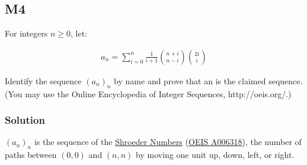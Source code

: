 \subsection*{M4}

For integers $n \geq 0$, let:

\begin{gather} \label{eq:m4}
    a_n = \sum_{i=0}^{n} \frac{1}{i+1} {{n+i}\choose{n-i}} {{2i}\choose{i}}
\end{gather}

Identify the sequence $(a_n)_n$ by name and prove that an is the claimed sequence. (You
may use the Online Encyclopedia of Integer Sequences, http://oeis.org/.)

\subsubsection*{Solution}

$(a_n)_n$ is the sequence of the \href{http://mathworld.wolfram.com/SchroederNumber.html}{Shroeder Numbers} (\href{https://oeis.org/A006318}{OEIS A006318}), the number of paths between $(0, 0)$ and $(n, n)$ by moving one unit up, down, left, or right.


